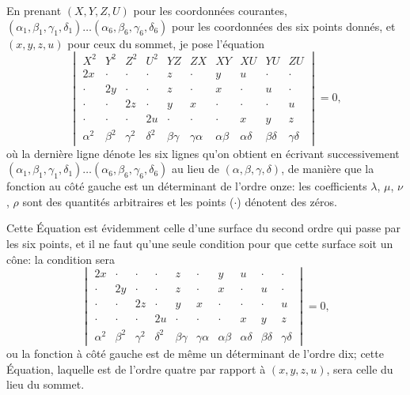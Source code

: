 \documentclass[11pt,a4paper]{article}
\begin{document}
En prenant $(X, Y, Z, U)$ pour les coordonn\'{e}es courantes, $(\alpha_1, \beta_1, \gamma_1, \delta_1) \ldots (\alpha_6, \beta_6, \gamma_6, \delta_6)$ pour les coordonn\'{e}es des six points donn\'{e}s, et $(x, y, z, u)$ pour ceux du sommet, je pose l'\'{e}quation
\[
\begin{vmatrix}
X^2 & Y^2 & Z^2 & U^2 & YZ & ZX & XY & XU & YU & ZU \\
2x & \cdot & \cdot & \cdot & z & \cdot & y & u & \cdot & \cdot \\
\cdot & 2y & \cdot & \cdot & z & \cdot & x & \cdot & u & \cdot \\
\cdot & \cdot & 2z & \cdot & y & x & \cdot & \cdot & \cdot & u \\
\cdot & \cdot & \cdot & 2u & \cdot & \cdot & \cdot & x & y & z \\
\alpha^2 & \beta^2 & \gamma^2 & \delta^2 & \beta\gamma & \gamma\alpha & \alpha\beta & \alpha\delta & \beta\delta & \gamma\delta
\end{vmatrix}
= 0,
\]
o\`{u} la derni\`{e}re ligne d\'{e}note les six lignes qu'on obtient en \'{e}crivant successivement $(\alpha_1, \beta_1, \gamma_1, \delta_1) \ldots (\alpha_6, \beta_6, \gamma_6, \delta_6)$ au lieu de $(\alpha, \beta, \gamma, \delta)$, de mani\`{e}re que la fonction au c\^{o}t\'{e} gauche est un d\'{e}terminant de l'ordre onze: les coefficients $\lambda$, $\mu$, $\nu$, $\rho$ sont des quantit\'{e}s arbitraires et les points ($\cdot$) d\'{e}notent des z\'{e}ros.

\clearpage

Cette \'{E}quation est \'{e}videmment celle d'une surface du second ordre qui passe par les six points, et il ne faut qu'une seule condition pour que cette surface soit un c\^{o}ne: la condition sera
\[
\begin{vmatrix}
2x & \cdot & \cdot & \cdot & z & \cdot & y & u & \cdot & \cdot \\
\cdot & 2y & \cdot & \cdot & z & \cdot & x & \cdot & u & \cdot \\
\cdot & \cdot & 2z & \cdot & y & x & \cdot & \cdot & \cdot & u \\
\cdot & \cdot & \cdot & 2u & \cdot & \cdot & \cdot & x & y & z \\
\alpha^2 & \beta^2 & \gamma^2 & \delta^2 & \beta\gamma & \gamma\alpha & \alpha\beta & \alpha\delta & \beta\delta & \gamma\delta
\end{vmatrix}
= 0,
\]
ou la fonction \`{a} c\^{o}t\'{e} gauche est de m\^{e}me un d\'{e}terminant de l'ordre dix; cette \'{E}quation, laquelle est de l'ordre quatre par rapport \`{a} $(x, y, z, u)$, sera celle du lieu du sommet.
\end{document}
